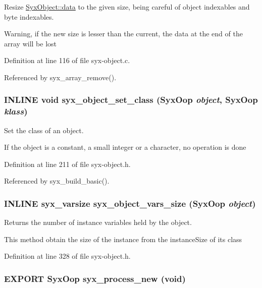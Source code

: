Resize \hyperlink{struct_syx_object_1613092e651dd77e4a0c1d0a1ec413cb}{SyxObject::data} to the given size, being careful of object indexables and byte indexables.

Warning, if the new size is lesser than the current, the data at the end of the array will be lost 

Definition at line 116 of file syx-object.c.

Referenced by syx\_\-array\_\-remove().\hypertarget{syx-object_8h_9c6faeef861a4eb3e3fb37ce9f8126f3}{
\subsubsection{\setlength{\rightskip}{0pt plus 5cm}INLINE void syx\_\-object\_\-set\_\-class ({\bf SyxOop} {\em object}, \/  {\bf SyxOop} {\em klass})}}
\label{syx-object_8h_9c6faeef861a4eb3e3fb37ce9f8126f3}


Set the class of an object.

If the object is a constant, a small integer or a character, no operation is done 

Definition at line 211 of file syx-object.h.

Referenced by syx\_\-build\_\-basic().\hypertarget{syx-object_8h_27fd8dfc7c2abc0d3e279624a676202b}{
\subsubsection{\setlength{\rightskip}{0pt plus 5cm}INLINE {\bf syx\_\-varsize} syx\_\-object\_\-vars\_\-size ({\bf SyxOop} {\em object})}}
\label{syx-object_8h_27fd8dfc7c2abc0d3e279624a676202b}


Returns the number of instance variables held by the object.

This method obtain the size of the instance from the instanceSize of its class 

Definition at line 328 of file syx-object.h.\hypertarget{syx-object_8h_cc28dff1a70eeea85e52a5501eda6b53}{
\subsubsection{\setlength{\rightskip}{0pt plus 5cm}EXPORT {\bf SyxOop} syx\_\-process\_\-new (void)}}
\label{syx-object_8h_cc28dff1a70eeea85e52a5501eda6b53}


